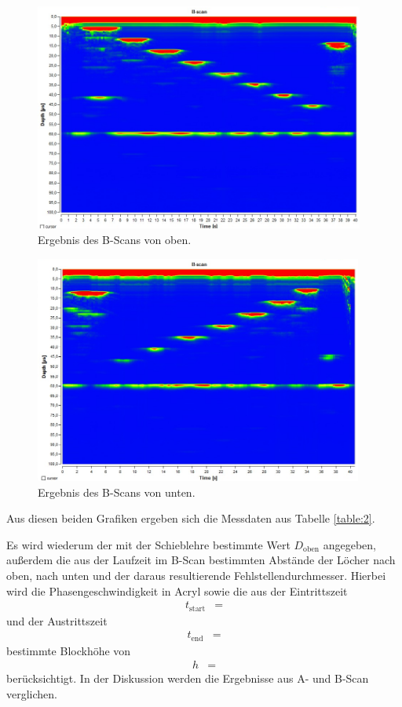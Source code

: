 \begin{figure}[H]
  \centering
  \includegraphics[height=7.5cm]{messdaten/b_oben.png}
  \caption{Ergebnis des B-Scans von oben.}
  \label{figure:1}
\end{figure}

\begin{figure}[H]
  \centering
  \includegraphics[height=7.5cm]{messdaten/b_unten.png}
  \caption{Ergebnis des B-Scans von unten.}
  \label{figure:2}
\end{figure}

Aus diesen beiden Grafiken ergeben sich die Messdaten aus Tabelle \ref{table:2}.

Es wird wiederum der mit der Schieblehre bestimmte Wert $D_\text{oben}$ angegeben, außerdem die aus der Laufzeit im B-Scan bestimmten Abstände der Löcher nach oben, nach unten und der daraus resultierende Fehlstellendurchmesser.
Hierbei wird die Phasengeschwindigkeit in Acryl sowie die aus der Eintrittszeit
\begin{align*}
  t_\text{start} &= 
\end{align*}
und der Austrittszeit
\begin{align*}
  t_\text{end} &= 
\end{align*}
bestimmte Blockhöhe von
\begin{align*}
  h &= 
\end{align*}
berücksichtigt.
In der Diskussion werden die Ergebnisse aus A- und B-Scan verglichen.

